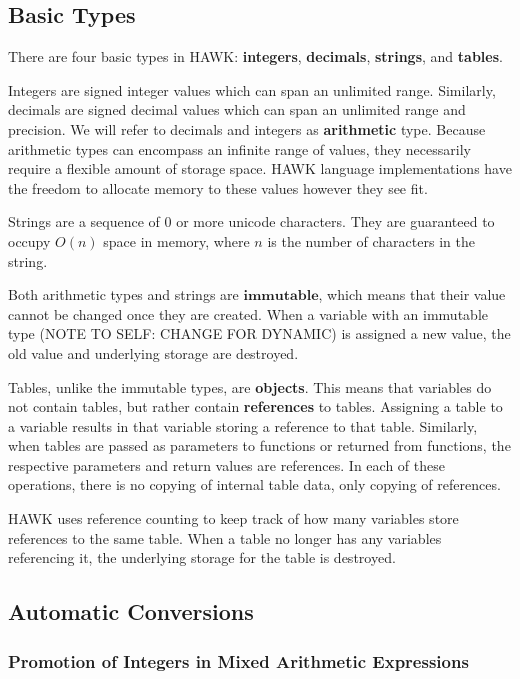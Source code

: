 \documentclass[12pt]{article}
\begin{document}
\subsection*{Basic Types}

There are four basic types in HAWK: \textbf{integers}, \textbf{decimals}, \textbf{strings}, and \textbf{tables}. 

Integers are signed integer values which can span an unlimited range. Similarly, decimals are signed decimal values which can span an unlimited range and precision. We will refer to decimals and integers as \textbf{arithmetic} type. Because arithmetic types can encompass an infinite range of values, they necessarily require a flexible amount of storage space. HAWK language implementations have the freedom to allocate memory to these values however they see fit.

Strings are a sequence of 0 or more unicode characters. They are guaranteed to occupy $O(n)$ space in memory, where $n$ is the number of characters in the string.

Both arithmetic types and strings are $\textbf{immutable}$, which means that their value cannot be changed once they are created. When a variable with an immutable type (NOTE TO SELF: CHANGE FOR DYNAMIC) is assigned a new value, the old value and underlying storage are destroyed. 

Tables, unlike the immutable types, are \textbf{objects}. This means that variables do not contain tables, but rather contain \textbf{references} to tables. Assigning a table to a variable results in that variable storing a reference to that table. Similarly, when tables are passed as parameters to functions or returned from functions, the respective parameters and return values are references. In each of these operations, there is no copying of internal table data, only copying of references. 

HAWK uses reference counting to keep track of how many variables store references to the same table. When a table no longer has any variables referencing it, the underlying storage for the table is destroyed.  

\subsection*{Automatic Conversions}

\subsubsection*{Promotion of Integers in Mixed Arithmetic Expressions}
\end{document}
